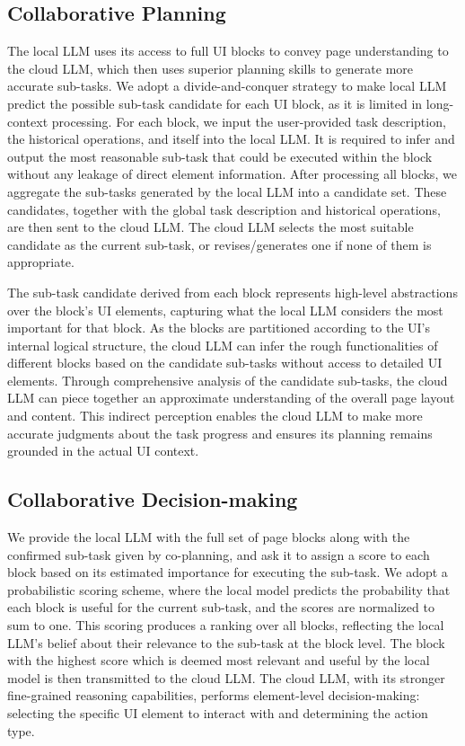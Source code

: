 \subsection{Collaborative Planning}\label{cp}
The local LLM uses its access to full UI blocks to convey page understanding to the cloud LLM, which then uses superior planning skills to generate more accurate sub-tasks. We adopt a divide-and-conquer strategy to make local LLM predict the possible sub-task candidate for each UI block, as it is limited in long-context processing. For each block, we input the user-provided task description, the historical operations, and itself into the local LLM. It is required to infer and output the most reasonable sub-task that could be executed within the block without any leakage of direct element information. After processing all blocks, we aggregate the sub-tasks generated by the local LLM into a candidate set. These candidates, together with the global task description and historical operations, are then sent to the cloud LLM. The cloud LLM selects the most suitable candidate as the current sub-task, or revises/generates one if none of them is appropriate. 

The sub-task candidate derived from each block represents high-level abstractions over the block's UI elements, capturing what the local LLM considers the most important for that block. As the blocks are partitioned according to the UI’s internal logical structure, the cloud LLM can infer the rough functionalities of different blocks based on the candidate sub-tasks without access to detailed UI elements. Through comprehensive analysis of the candidate sub-tasks, the cloud LLM can piece together an approximate understanding of the overall page layout and content. This indirect perception enables the cloud LLM to make more accurate judgments about the task progress and ensures its planning remains grounded in the actual UI context.

\subsection{Collaborative Decision-making}\label{cd}
We provide the local LLM with the full set of page blocks along with the confirmed sub-task given by co-planning, and ask it to assign a score to each block based on its estimated importance for executing the sub-task. We adopt a probabilistic scoring scheme, where the local model predicts the probability that each block is useful for the current sub-task, and the scores are normalized to sum to one. This scoring produces a ranking over all blocks, reflecting the local LLM's belief about their relevance to the sub-task at the block level. The block with the highest score which is deemed most relevant and useful by the local model is then transmitted to the cloud LLM. The cloud LLM, with its stronger fine-grained reasoning capabilities, performs element-level decision-making: selecting the specific UI element to interact with and determining the action type. 


